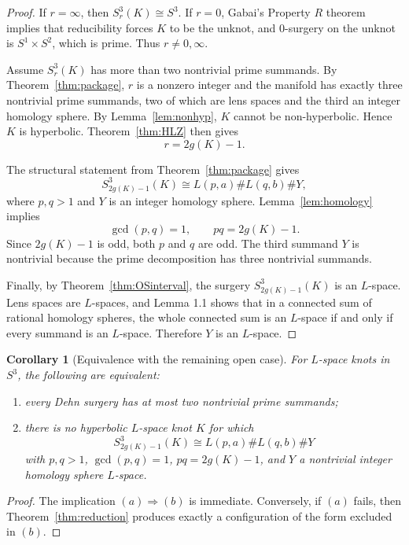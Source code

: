 \documentclass[11pt]{article}
\newtheorem{corollary}[theorem]{Corollary}
\theoremstyle{definition}
\theoremstyle{remark}
\begin{document}
\begin{proof}
If \(r=\infty\), then \(S^{3}_{r}(K)\cong S^{3}\).  If \(r=0\), Gabai's
Property \(R\) theorem implies that reducibility forces \(K\) to be the unknot,
and \(0\)-surgery on the unknot is \(S^{1}\times S^{2}\), which is prime.
Thus \(r\neq 0,\infty\).

Assume \(S^{3}_{r}(K)\) has more than two nontrivial prime summands.  By
Theorem~\ref{thm:package}, \(r\) is a nonzero integer and the manifold has
exactly three nontrivial prime summands, two of which are lens spaces and the
third an integer homology sphere.  By Lemma~\ref{lem:nonhyp}, \(K\) cannot be
non-hyperbolic.  Hence \(K\) is hyperbolic.  Theorem~\ref{thm:HLZ} then gives
\[
        r=2g(K)-1.
\]

The structural statement from Theorem~\ref{thm:package} gives
\[
        S^{3}_{2g(K)-1}(K)\cong L(p,a)\#L(q,b)\#Y,
\]
where \(p,q>1\) and \(Y\) is an integer homology sphere.  Lemma~\ref{lem:homology}
implies
\[
        \gcd(p,q)=1,\qquad pq=2g(K)-1.
\]
Since \(2g(K)-1\) is odd, both \(p\) and \(q\) are odd.  The third summand
\(Y\) is nontrivial because the prime decomposition has three nontrivial
summands.

Finally, by Theorem~\ref{thm:OSinterval}, the surgery
\(S^{3}_{2g(K)-1}(K)\) is an \(L\)-space.  Lens spaces are \(L\)-spaces, and
Lemma 1.1 shows that in a connected sum of rational homology spheres, the
whole connected sum is an \(L\)-space if and only if every summand is an
\(L\)-space.  Therefore \(Y\) is an \(L\)-space.
\end{proof}

\begin{corollary}[Equivalence with the remaining open case]\label{cor:equiv}
For \(L\)-space knots in \(S^{3}\), the following are equivalent:
\begin{enumerate}[label=(\alph*)]
\item every Dehn surgery has at most two nontrivial prime summands;
\item there is no hyperbolic \(L\)-space knot \(K\) for which
\[
        S^{3}_{2g(K)-1}(K)
        \cong L(p,a)\#L(q,b)\#Y
\]
with \(p,q>1\), \(\gcd(p,q)=1\), \(pq=2g(K)-1\), and \(Y\) a nontrivial
integer homology sphere \(L\)-space.
\end{enumerate}
\end{corollary}

\begin{proof}
The implication \((a)\Rightarrow(b)\) is immediate.  Conversely, if \((a)\)
fails, then Theorem~\ref{thm:reduction} produces exactly a configuration of
the form excluded in \((b)\).
\end{proof}
\end{document}
